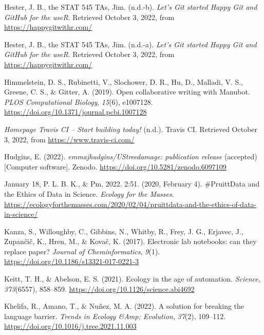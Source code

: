 \begin{CSLReferences}{1}{0}
\leavevmode{}%
Hester, J. B., the STAT 545 TAs, Jim. (n.d.-b). \emph{Let's Git started \textbar{} Happy Git and GitHub for the useR}. Retrieved October 3, 2022, from \url{https://happygitwithr.com/}

\leavevmode{}%
Hester, J. B., the STAT 545 TAs, Jim. (n.d.-a). \emph{Let's Git started \textbar{} Happy Git and GitHub for the useR}. Retrieved October 3, 2022, from \url{https://happygitwithr.com/}

\leavevmode{}%
Himmelstein, D. S., Rubinetti, V., Slochower, D. R., Hu, D., Malladi, V. S., Greene, C. S., \& Gitter, A. (2019). Open collaborative writing with Manubot. \emph{PLOS Computational Biology}, \emph{15}(6), e1007128. \url{https://doi.org/10.1371/journal.pcbi.1007128}

\leavevmode{}%
\emph{Homepage \textbar{} Travis CI -- Start building today!} (n.d.). Travis CI. Retrieved October 3, 2022, from \url{https://www.travis-ci.com/}

\leavevmode{}%
Hudgins, E. (2022). \emph{emmajhudgins/UStreedamage: publication release} (accepted) {[}Computer software{]}. Zenodo. \url{https://doi.org/10.5281/zenodo.6097109}

\leavevmode{}%
January 18, P. L. B. K., \& Pm, 2022. 2:51. (2020, February 4). \#PruittData and the Ethics of Data in Science. \emph{Ecology for the Masses}. \url{https://ecologyforthemasses.com/2020/02/04/pruittdata-and-the-ethics-of-data-in-science/}

\leavevmode{}%
Kanza, S., Willoughby, C., Gibbins, N., Whitby, R., Frey, J. G., Erjavec, J., Zupančič, K., Hren, M., \& Kovač, K. (2017). Electronic lab notebooks: can they replace paper? \emph{Journal of Cheminformatics}, \emph{9}(1). \url{https://doi.org/10.1186/s13321-017-0221-3}

\leavevmode{}%
Keitt, T. H., \& Abelson, E. S. (2021). Ecology in the age of automation. \emph{Science}, \emph{373}(6557), 858--859. \url{https://doi.org/10.1126/science.abi4692}

\leavevmode{}%
Khelifa, R., Amano, T., \& Nuñez, M. A. (2022). A solution for breaking the language barrier. \emph{Trends in Ecology \&Amp; Evolution}, \emph{37}(2), 109--112. \url{https://doi.org/10.1016/j.tree.2021.11.003}


\end{CSLReferences}
